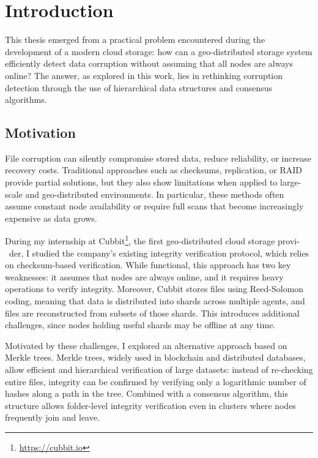 \chapter{Introduction}

This thesis emerged from a practical problem encountered during the development
of a modern cloud storage: how can a geo-distributed storage system efficiently
detect data corruption without assuming that all nodes are always online? The answer, as explored in this work, lies in rethinking corruption detection through the use of hierarchical data structures and consensus algorithms.

\section{Motivation}

File corruption can silently compromise stored data, reduce reliability, or increase recovery costs. Traditional approaches such as checksums, replication, or RAID \cite{chen1994raid} provide partial solutions, but they also show limitations when applied to large-scale and geo-distributed environments. In particular, these methods often assume constant node availability or require full scans that become increasingly expensive as data grows.

During my internship at Cubbit\footnote{\url{https://cubbit.io}}, the first geo-distributed cloud storage provi-\ der, I studied the company's existing integrity verification protocol, which relies on checksum-based verification. While functional, this approach has two key weaknesses: it assumes that nodes are always online, and it requires heavy operations to verify integrity. Moreover, Cubbit stores files using Reed-Solomon coding, meaning that data is distributed into shards across multiple agents, and files are reconstructed from subsets of those shards. This introduces additional challenges, since nodes holding useful shards may be offline at any time.

Motivated by these challenges, I explored an alternative approach based on Merkle trees. Merkle trees, widely used in blockchain and distributed databases, allow efficient and hierarchical verification of large datasets: instead of re-checking entire files, integrity can be confirmed by verifying only a logarithmic number of hashes along a path in the tree. Combined with a consensus algorithm, this structure allows folder-level integrity verification even in clusters where nodes frequently join and leave.

